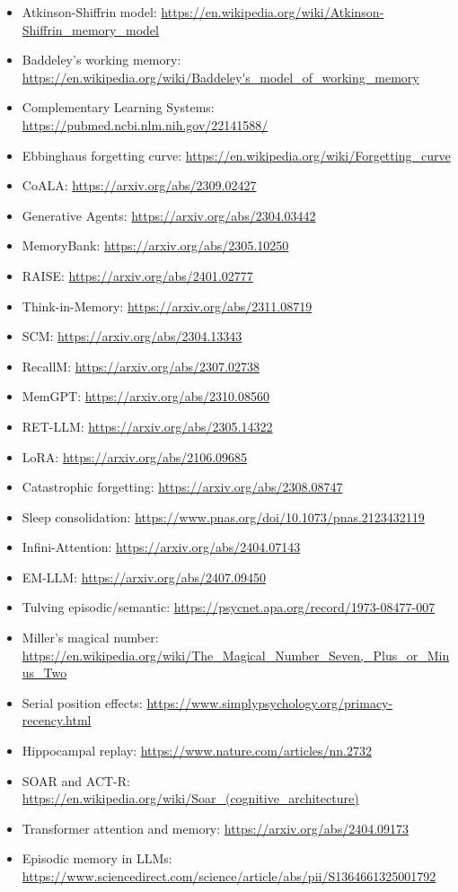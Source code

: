 \documentclass[11pt,letterpaper]{article}
\begin{document}
\begin{itemize}[leftmargin=*]
    \item Atkinson-Shiffrin model: \url{https://en.wikipedia.org/wiki/Atkinson-Shiffrin_memory_model}
    \item Baddeley's working memory: \url{https://en.wikipedia.org/wiki/Baddeley's_model_of_working_memory}
    \item Complementary Learning Systems: \url{https://pubmed.ncbi.nlm.nih.gov/22141588/}
    \item Ebbinghaus forgetting curve: \url{https://en.wikipedia.org/wiki/Forgetting_curve}
    \item CoALA: \url{https://arxiv.org/abs/2309.02427}
    \item Generative Agents: \url{https://arxiv.org/abs/2304.03442}
    \item MemoryBank: \url{https://arxiv.org/abs/2305.10250}
    \item RAISE: \url{https://arxiv.org/abs/2401.02777}
    \item Think-in-Memory: \url{https://arxiv.org/abs/2311.08719}
    \item SCM: \url{https://arxiv.org/abs/2304.13343}
    \item RecallM: \url{https://arxiv.org/abs/2307.02738}
    \item MemGPT: \url{https://arxiv.org/abs/2310.08560}
    \item RET-LLM: \url{https://arxiv.org/abs/2305.14322}
    \item LoRA: \url{https://arxiv.org/abs/2106.09685}
    \item Catastrophic forgetting: \url{https://arxiv.org/abs/2308.08747}
    \item Sleep consolidation: \url{https://www.pnas.org/doi/10.1073/pnas.2123432119}
    \item Infini-Attention: \url{https://arxiv.org/abs/2404.07143}
    \item EM-LLM: \url{https://arxiv.org/abs/2407.09450}
    \item Tulving episodic/semantic: \url{https://psycnet.apa.org/record/1973-08477-007}
    \item Miller's magical number: \url{https://en.wikipedia.org/wiki/The_Magical_Number_Seven,_Plus_or_Minus_Two}
    \item Serial position effects: \url{https://www.simplypsychology.org/primacy-recency.html}
    \item Hippocampal replay: \url{https://www.nature.com/articles/nn.2732}
    \item SOAR and ACT-R: \url{https://en.wikipedia.org/wiki/Soar_(cognitive_architecture)}
    \item Transformer attention and memory: \url{https://arxiv.org/abs/2404.09173}
    \item Episodic memory in LLMs: \url{https://www.sciencedirect.com/science/article/abs/pii/S1364661325001792}
\end{itemize}
\end{document}
